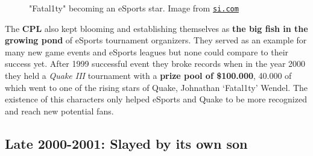 \begin{figure}
	\begin{center}
		
		\caption{"Fatal1ty" becoming an eSports star. Image from \href{https://www.si.com/more-sports/2016/06/30/fatal1ty-esports-professional-gaming-prize-money-motherboards}{\nolinkurl{si.com}}}
	\end{center}
\end{figure}

The \textbf{CPL} also kept blooming and establishing themselves as \textbf{the big fish in the growing pond} of eSports tournament organizers. They served as an example for many new game events and eSports leagues but none could compare to their success yet. After 1999 successful event they broke records when in the year 2000 they held a \textit{Quake III} tournament with a \textbf{prize pool of \$100.000}, 40.000 of which went to one of the rising stars of Quake, Johnathan ‘Fatal1ty’ Wendel. The existence of this characters only helped eSports and Quake to be more recognized and reach new potential fans.


\subsection{Late 2000-2001: Slayed by its own son}



